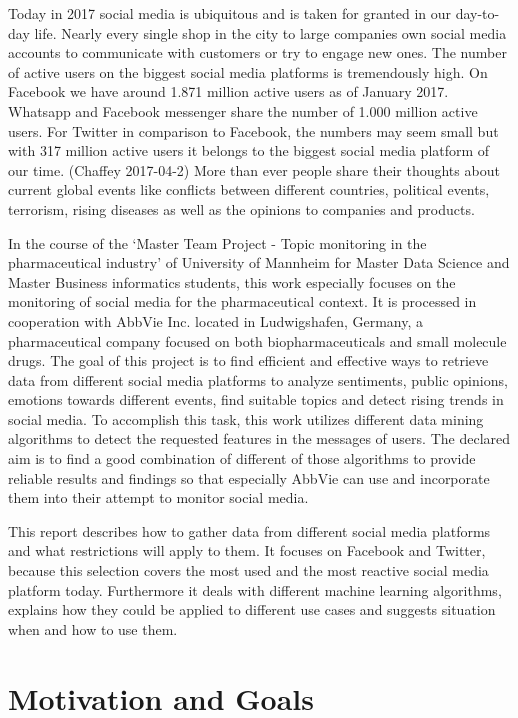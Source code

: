 \documentclass[11pt,titlepage,oneside,openany]{book}
\begin{document}
Today in 2017 social media is ubiquitous and is taken for granted in our day-to-day life. Nearly every single shop in the city to large companies own social media accounts to communicate with customers or try to engage new ones. The number of active users on the biggest social media platforms is tremendously high. On Facebook we have around 1.871 million active users as of January 2017. Whatsapp and Facebook messenger share the number of 1.000 million active users. For Twitter in comparison to Facebook, the numbers may seem small but with 317 million active users it belongs to the biggest social media platform of our time. (Chaffey 2017-04-2) More than ever people share their thoughts about current global events like conflicts between different countries, political events, terrorism, rising diseases as well as the opinions to companies and products. 

In the course of the ‘Master Team Project - Topic monitoring in the pharmaceutical industry’ of University of Mannheim for Master Data Science and Master Business informatics students, this work especially focuses on the monitoring of social media for the pharmaceutical context. It is processed in cooperation with AbbVie Inc. located in Ludwigshafen, Germany, a pharmaceutical company focused on both biopharmaceuticals and small molecule drugs. The goal of this project is to find efficient and effective ways to retrieve data from different social media platforms to analyze sentiments, public opinions, emotions towards different events, find suitable topics and detect rising trends in social media. To accomplish this task, this work utilizes different data mining algorithms to detect the requested features in the messages of users. The declared aim is to find a good combination of different of those algorithms to provide reliable results and findings so that especially AbbVie can use and incorporate them into their attempt to monitor social media.

This report describes how to gather data from different social media platforms and what restrictions will apply to them. It focuses on Facebook and Twitter, because this selection covers the most used and the most reactive social media platform today. Furthermore it deals with different machine learning algorithms, explains how they could be applied to different use cases and suggests situation when and how to use them.  


 
\section{Motivation and Goals}
 
\end{document}
